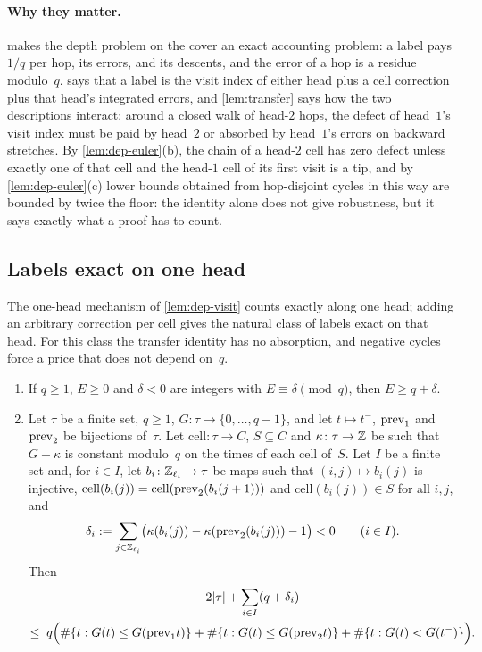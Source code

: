 \paragraph{Why they matter.}  makes the depth problem on the cover an exact accounting problem: a label
pays $1/q$ per hop, its errors, and its descents, and the error of a hop is a residue modulo~$q$. 
says that a label is the visit index of either head plus a cell correction plus that head's integrated errors, and
\cref{lem:transfer} says how the two descriptions interact: around a closed walk of head-$2$ hops, the defect of
head~$1$'s visit index must be paid by head~$2$ or absorbed by head~$1$'s errors on backward stretches. By
\cref{lem:dep-euler}(b), the chain of a head-$2$ cell has zero defect unless exactly one of that cell and the head-$1$
cell of its first visit is a tip, and by \cref{lem:dep-euler}(c) lower bounds obtained from hop-disjoint cycles in
this way are bounded by twice the floor: the identity alone does not give robustness, but it says exactly
what a proof has to count.

\subsection{Labels exact on one head}\label{sec:dep-exact}

The one-head mechanism of \cref{lem:dep-visit} counts exactly along one head; adding an arbitrary correction per cell
gives the natural class of labels exact on that head. For this class the transfer identity has no absorption, and
negative cycles force a price that does not depend on~$q$.

\begin{theorem}\label{thm:E}
\begin{enumerate}[label=(\alph*)]
\item If $q\ge1$, $E\ge0$ and $\delta<0$ are integers with $E\equiv\delta\pmod q$, then $E\ge q+\delta$.
\item Let $\tau$ be a finite set, $q\ge1$, $G\colon\tau\to\{0,\dots,q-1\}$, and let $t\mapsto t^-$, $\mathrm{prev}_1$ and
$\mathrm{prev}_2$ be bijections of~$\tau$. Let $\mathrm{cell}\colon\tau\to C$, $S\subseteq C$ and $\kappa\colon\tau\to\mathbb{Z}$ be
such that $G-\kappa$ is constant modulo~$q$ on the times of each cell of~$S$. Let $I$ be a finite set and, for $i\in I$,
let $b_i\colon\mathbb{Z}_{\ell_i}\to\tau$ be maps such that $(i,j)\mapsto b_i(j)$ is injective,
$\mathrm{cell}(b_i(j))=\mathrm{cell}(\mathrm{prev}_2(b_i(j+1)))$ and $\mathrm{cell}(b_i(j))\in S$ for all $i,j$, and
\[
  \delta_i:=\sum_{j\in\mathbb{Z}_{\ell_i}}\bigl(\kappa(b_i(j))-\kappa(\mathrm{prev}_2(b_i(j)))-1\bigr)<0\qquad(i\in I).
\]
Then
\begin{multline*}
  2\lvert \tau \rvert+\sum_{i\in I}(q+\delta_i)\\
  \le\;q\Bigl(\#\{t:G(t)\le G(\mathrm{prev}_1t)\}+\#\{t:G(t)\le G(\mathrm{prev}_2t)\}+\#\{t:G(t)<G(t^-)\}\Bigr).
\end{multline*}
\end{enumerate}
\end{theorem}

